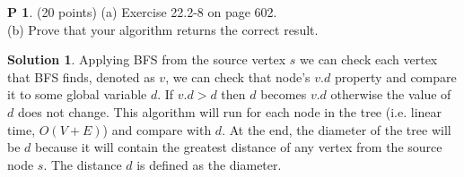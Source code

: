 \documentclass{article}
\theoremstyle{definition}
\newtheorem{problem}{P}
\newtheorem*{solution}{Solution}
\begin{document}
\begin{problem} (20 points)
(a) Exercise 22.2-8 on page 602. \\
(b) Prove that your algorithm returns the correct result. 
\end{problem}
\begin{solution}
Applying BFS from the source vertex $s$ we can check each vertex that BFS finds, denoted as $v$, we can check that node's $v.d$ property and compare it to some global variable $d$. If $v.d > d$ then $d$ becomes $v.d$ otherwise the value of $d$ does not change. This algorithm will run for each node in the tree (i.e. linear time, $O(V+E)$) and compare with $d$. At the end, the diameter of the tree will be $d$ because it will contain the greatest distance of any vertex from the source node $s$. The distance $d$ is defined as the diameter.
\end{solution}
\end{document}
